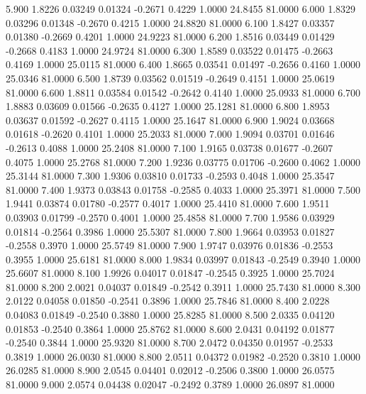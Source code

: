    5.900   1.8226   0.03249   0.01324  -0.2671   0.4229   1.0000  24.8455  81.0000
   6.000   1.8329   0.03296   0.01348  -0.2670   0.4215   1.0000  24.8820  81.0000
   6.100   1.8427   0.03357   0.01380  -0.2669   0.4201   1.0000  24.9223  81.0000
   6.200   1.8516   0.03449   0.01429  -0.2668   0.4183   1.0000  24.9724  81.0000
   6.300   1.8589   0.03522   0.01475  -0.2663   0.4169   1.0000  25.0115  81.0000
   6.400   1.8665   0.03541   0.01497  -0.2656   0.4160   1.0000  25.0346  81.0000
   6.500   1.8739   0.03562   0.01519  -0.2649   0.4151   1.0000  25.0619  81.0000
   6.600   1.8811   0.03584   0.01542  -0.2642   0.4140   1.0000  25.0933  81.0000
   6.700   1.8883   0.03609   0.01566  -0.2635   0.4127   1.0000  25.1281  81.0000
   6.800   1.8953   0.03637   0.01592  -0.2627   0.4115   1.0000  25.1647  81.0000
   6.900   1.9024   0.03668   0.01618  -0.2620   0.4101   1.0000  25.2033  81.0000
   7.000   1.9094   0.03701   0.01646  -0.2613   0.4088   1.0000  25.2408  81.0000
   7.100   1.9165   0.03738   0.01677  -0.2607   0.4075   1.0000  25.2768  81.0000
   7.200   1.9236   0.03775   0.01706  -0.2600   0.4062   1.0000  25.3144  81.0000
   7.300   1.9306   0.03810   0.01733  -0.2593   0.4048   1.0000  25.3547  81.0000
   7.400   1.9373   0.03843   0.01758  -0.2585   0.4033   1.0000  25.3971  81.0000
   7.500   1.9441   0.03874   0.01780  -0.2577   0.4017   1.0000  25.4410  81.0000
   7.600   1.9511   0.03903   0.01799  -0.2570   0.4001   1.0000  25.4858  81.0000
   7.700   1.9586   0.03929   0.01814  -0.2564   0.3986   1.0000  25.5307  81.0000
   7.800   1.9664   0.03953   0.01827  -0.2558   0.3970   1.0000  25.5749  81.0000
   7.900   1.9747   0.03976   0.01836  -0.2553   0.3955   1.0000  25.6181  81.0000
   8.000   1.9834   0.03997   0.01843  -0.2549   0.3940   1.0000  25.6607  81.0000
   8.100   1.9926   0.04017   0.01847  -0.2545   0.3925   1.0000  25.7024  81.0000
   8.200   2.0021   0.04037   0.01849  -0.2542   0.3911   1.0000  25.7430  81.0000
   8.300   2.0122   0.04058   0.01850  -0.2541   0.3896   1.0000  25.7846  81.0000
   8.400   2.0228   0.04083   0.01849  -0.2540   0.3880   1.0000  25.8285  81.0000
   8.500   2.0335   0.04120   0.01853  -0.2540   0.3864   1.0000  25.8762  81.0000
   8.600   2.0431   0.04192   0.01877  -0.2540   0.3844   1.0000  25.9320  81.0000
   8.700   2.0472   0.04350   0.01957  -0.2533   0.3819   1.0000  26.0030  81.0000
   8.800   2.0511   0.04372   0.01982  -0.2520   0.3810   1.0000  26.0285  81.0000
   8.900   2.0545   0.04401   0.02012  -0.2506   0.3800   1.0000  26.0575  81.0000
   9.000   2.0574   0.04438   0.02047  -0.2492   0.3789   1.0000  26.0897  81.0000
